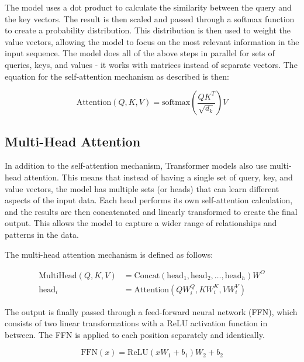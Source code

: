 \documentclass[twoside]{ctuthesis}
\theoremstyle{plain}
\theoremstyle{definition}
\theoremstyle{note}
\begin{document}
The model uses a dot product to calculate the similarity between the query and the key vectors. The result is then scaled and passed through a softmax function to create a probability distribution. This distribution is then used to weight the value vectors, allowing the model to focus on the most relevant information in the input sequence. The model does all of the above steps in parallel for sets of queries, keys, and values - it works with matrices instead of separate vectors. The equation for the self-attention mechanism as described is then:\par

\begin{equation}
	\text{Attention}(Q, K, V) = \text{softmax}\left(\frac{QK^T}{\sqrt{d_k}}\right)V
\end{equation}


\subsection{Multi-Head Attention}

In addition to the self-attention mechanism, Transformer models also use multi-head attention. This means that instead of having a single set of query, key, and value vectors, the model has multiple sets (or heads) that can learn different aspects of the input data. Each head performs its own self-attention calculation, and the results are then concatenated and linearly transformed to create the final output. This allows the model to capture a wider range of relationships and patterns in the data.\par
The multi-head attention mechanism is defined as follows:

\begin{align}
 \text{MultiHead}(Q, K, V) &= \text{Concat}(\text{head}_1, \text{head}_2, \ldots, \text{head}_h)W^O \\
 \text{head}_i &= \text{Attention}(QW_i^Q, KW_i^K, VW_i^V)
\end{align}

The output is finally passed through a feed-forward neural network (FFN), which consists of two linear transformations with a ReLU activation function in between. The FFN is applied to each position separately and identically.\par

\begin{equation}
 \text{FFN}(x) = \text{ReLU}(xW_1 + b_1)W_2 + b_2 
\end{equation}
\end{document}
